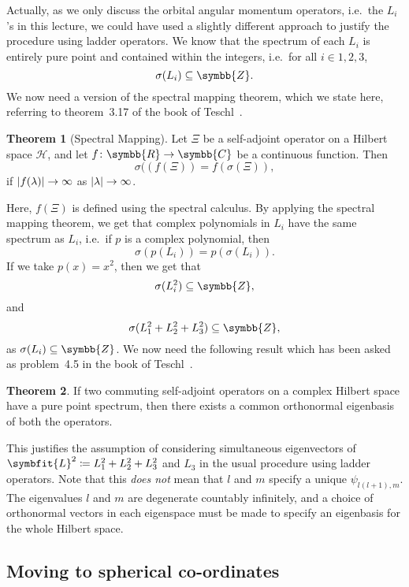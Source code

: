 \documentclass[12pt, a4 paper]{article}
\let\symcal\mathcal
\theoremstyle{definition}
\newtheorem{thm}{Theorem}
\newcommand{\rr}{\symbb{R}}
\newcommand{\cc}{\symbb{C}}
\newcommand{\zz}{\symbb{Z}}
\newcommand{\hilbert}{\symcal{H}}
\newcommand{\spec}{\sigma}
\DeclarePairedDelimiter{\abs}{\lvert}{\rvert}
\begin{document}
    Actually, as we only discuss the orbital angular momentum operators, i.e.\ the \(L_i\)'s in this lecture, we could have used a slightly different approach to justify the procedure using ladder operators. We know that the spectrum of each \(L_i\) is entirely pure point and contained within the integers, i.e.\ for all \(i \in {1, 2, 3}\),
    \[
        \spec(L_i) \subseteq \zz.
    \]
    We now need a version of the spectral mapping theorem, which we state here, referring to theorem~3.17 of the book of Teschl~\cite[p.~118]{Teschl}.
    \begin{thm}[Spectral Mapping]
        Let \(\Xi\) be a self-adjoint operator on a Hilbert space \(\hilbert\), and let \(f \colon \rr \rightarrow \cc\) be a continuous function. Then
        \[
            \spec((f(\Xi)) = f(\spec(\Xi)),
        \]
        if \(\abs{f(\lambda)} \rightarrow \infty\) as \(\abs{\lambda} \rightarrow \infty\).
    \end{thm}
    Here, \(f(\Xi)\) is defined using the spectral calculus. By applying the spectral mapping theorem, we get that complex polynomials in \(L_i\) have the same spectrum as \(L_i\), i.e.\ if \(p\) is a complex polynomial, then
    \[
        \spec(p(L_i)) = p(\spec(L_i)).
    \]
    If we take \(p(x) = x^2\), then we get that \[\spec(L_i^2) \subseteq \zz,\] and \[\spec(L_1^2 + L_2^2 + L_3^2) \subseteq \zz,\] as \(\spec(L_i) \subseteq \zz\). We now need the following result which has been asked as problem~4.5 in the book of Teschl~\cite[p.~138]{Teschl}.
    \begin{thm}
        If two commuting self-adjoint operators on a complex Hilbert space have a pure point spectrum, then there exists a common orthonormal eigenbasis of both the operators.
    \end{thm}
    This justifies the assumption of considering simultaneous eigenvectors of \(\symbfit{L}^2 \coloneq L_1^2 + L_2^2 + L_3^2\) and \(L_3\) in the usual procedure using ladder operators. Note that this \textit{does not} mean that \(l\) and \(m\) specify a unique \(\psi_{l(l+1), m}\). The eigenvalues \(l\) and \(m\) are degenerate countably infinitely, and a choice of orthonormal vectors in each eigenspace must be made to specify an eigenbasis for the whole Hilbert space.

    \subsection{Moving to spherical co-ordinates}
\end{document}
